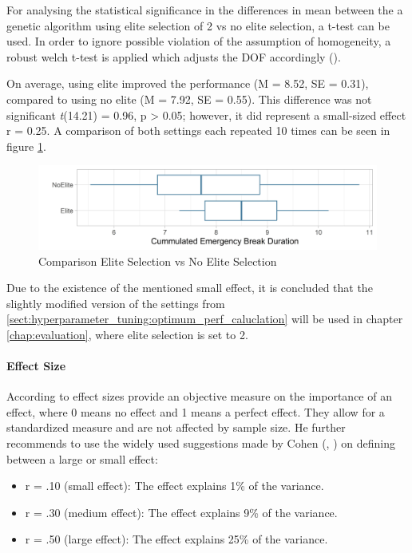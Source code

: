 For analysing the statistical significance in the differences in mean between the a genetic algorithm using elite selection of 2 vs no elite selection, a t-test can be used. In order to ignore possible violation of the assumption of homogeneity, a robust welch t-test is applied which adjusts the DOF accordingly (\cite{field_discovering_2012}).

On average, using elite improved the performance (M = 8.52, SE = 0.31), compared to using no elite (M = 7.92, SE = 0.55). This difference was not significant \textit{t}(14.21) = 0.96, p > 0.05; however, it did represent a small-sized effect r = 0.25. A comparison of both settings each repeated 10 times can be seen in figure \ref{fig:hyperparameter_tuning:elite_comparison}.

\begin{figure}[ht] 
	\label{fig:hyperparameter_tuning:elite_comparison}
	\includegraphics[width=1\linewidth]{simulations/evaluation/plots/elite_vs_no_elite}
	\caption{Comparison Elite Selection vs No Elite Selection}
\end{figure}

Due to the existence of the mentioned small effect, it is concluded that the slightly modified version of the settings from \ref{sect:hyperparameter_tuning:optimum_perf_caluclation} will be used in chapter \ref{chap:evaluation}, where elite selection is set to 2.

\paragraph{Effect Size}
According to \cite{field_discovering_2012} effect sizes provide an objective measure on the importance of an effect, where 0 means no effect and 1 means a perfect effect. They allow for a standardized measure and are not affected by sample size. He further recommends to use the widely used suggestions made by Cohen (\cite{cohen_statistical_1988}, \cite{cohen_power_1992}) on defining between a large or small effect:

\begin{itemize}
	\item r = .10 (small effect): The effect explains 1\% of the variance. 
	\item r = .30 (medium effect): The effect explains 9\% of the variance. 
	\item r = .50 (large effect): The effect explains 25\% of the variance.
\end{itemize} 

